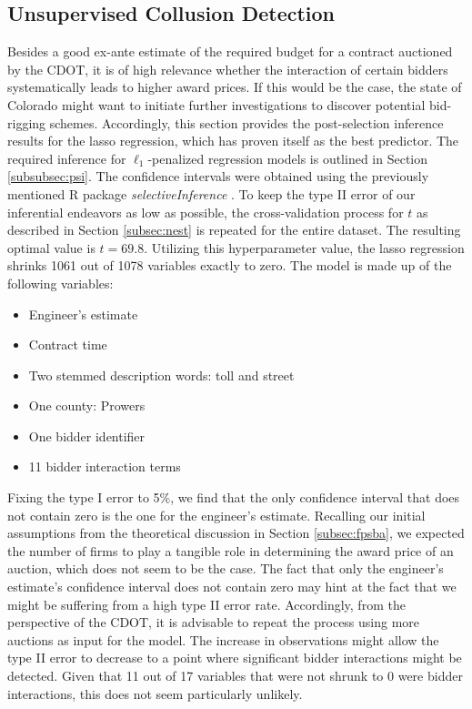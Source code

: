 \documentclass[a4paper,12pt, headsepline]{scrartcl}
\numberwithin{equation}{section}
\begin{document}
\subsection{Unsupervised Collusion Detection}\label{subsec:col}
Besides a good ex-ante estimate of the required budget for a contract auctioned by the CDOT, it is of high relevance whether the interaction of certain bidders systematically leads to higher award prices. If this would be the case, the state of Colorado might want to initiate further investigations to discover potential bid-rigging schemes. Accordingly, this section provides the post-selection inference results for the lasso regression, which has proven itself as the best predictor. The required inference for $\ell_1$-penalized regression models is outlined in Section \ref{subsubsec:psi}. The confidence intervals were obtained using the previously mentioned R package \textit{selectiveInference} \citep{selectiveInference}. To keep the type II error of our inferential endeavors as low as possible, the cross-validation process for $t$ as described in Section \ref{subsec:nest} is repeated for the entire dataset. The resulting optimal value is $t = 69.8$. Utilizing this hyperparameter value, the lasso regression shrinks 1061 out of 1078 variables exactly to zero. The model is made up of the following variables:
\begin{itemize}
	\item Engineer's estimate
	\item Contract time
	\item Two stemmed description words: toll and street
	\item One county: Prowers
	\item One bidder identifier
	\item 11 bidder interaction terms 
\end{itemize}
Fixing the type I error to 5\%, we find that the only confidence interval that does not contain zero is the one for the engineer's estimate. Recalling our initial assumptions from the theoretical discussion in Section \ref{subsec:fpsba}, we expected the number of firms to play a tangible role in determining the award price of an auction, which does not seem to be the case. The fact that only the engineer's estimate's confidence interval does not contain zero may hint at the fact that we might be suffering from a high type II error rate. Accordingly, from the perspective of the CDOT, it is advisable to repeat the process using more auctions as input for the model. The increase in observations might allow the type II error to decrease to a point where significant bidder interactions might be detected. Given that 11 out of 17 variables that were not shrunk to 0 were bidder interactions, this does not seem particularly unlikely.
\end{document}
